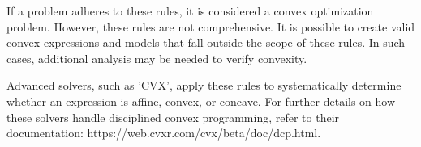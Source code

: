 If a problem adheres to these rules, it is considered a convex optimization problem.
However, these rules are not comprehensive.
It is possible to create valid convex expressions and models that fall outside the scope of these rules.
In such cases, additional analysis may be needed to verify convexity.

Advanced solvers, such as 'CVX', apply these rules to systematically determine whether an expression is affine, convex, or concave.
For further details on how these solvers handle disciplined convex programming, refer to their documentation:
https://web.cvxr.com/cvx/beta/doc/dcp.html.
